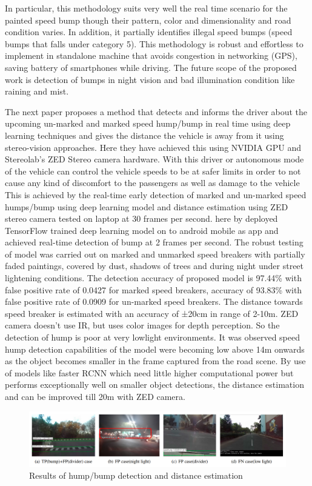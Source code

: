 \noindent
In particular, this methodology suits very well the real time scenario for the painted speed bump though their pattern, color and dimensionality and road condition varies. In addition, it partially identifies illegal speed bumps (speed bumps that falls under category 5). This methodology is robust and effortless to implement in standalone machine that avoids congestion in networking (GPS), saving battery of smartphones while driving. The future scope of the proposed work is detection of bumps in night vision and bad illumination condition like raining and mist.

\noindent
The next paper proposes a method that detects and informs the driver about the upcoming un-marked and marked speed hump/bump in real time using deep learning techniques and gives the distance the vehicle is away from it using stereo-vision approaches. Here they have achieved this using NVIDIA GPU and Stereolab's ZED Stereo camera hardware\cite{R14}. With this driver or autonomous mode of the vehicle can control the vehicle speeds to be at safer limits in order to not cause any kind of discomfort to the passengers as well as damage to the vehicle  This is  achieved by the real-time early detection of marked and un-marked speed humps/bump using deep learning model and distance estimation using ZED stereo camera tested on laptop at 30 frames per second. here by deployed TensorFlow trained deep learning model on to android mobile as app and achieved real-time detection of bump at 2 frames per second. The robust testing of model was carried out on marked and unmarked speed breakers with partially faded paintings, covered by dust, shadows of trees and during night under street lightening conditions. The detection accuracy of proposed model is 97.44\% with false positive rate of 0.0427 for marked speed breakers, accuracy of 93.83\% with false positive rate of 0.0909 for un-marked speed breakers. The distance towards speed breaker is estimated with an accuracy of ±20cm in range of 2-10m. ZED camera doesn’t use IR, but uses color images for depth perception. So the detection of hump is poor at very lowlight environments. It was observed speed hump detection capabilities of the model were becoming low above 14m onwards as the object becomes smaller in the frame captured from the road scene. By use of models like faster RCNN which need little higher computational power but performs exceptionally well on smaller object detections, the distance estimation and can be improved till 20m with ZED camera.

\begin{figure}[h]
    \centering
    \includegraphics[scale=0.48]{Figures/chapter2/literature_results1.png}
    \caption{ Results of hump/bump detection and distance estimation}
    \label{fig:lit_res}
\end{figure}


